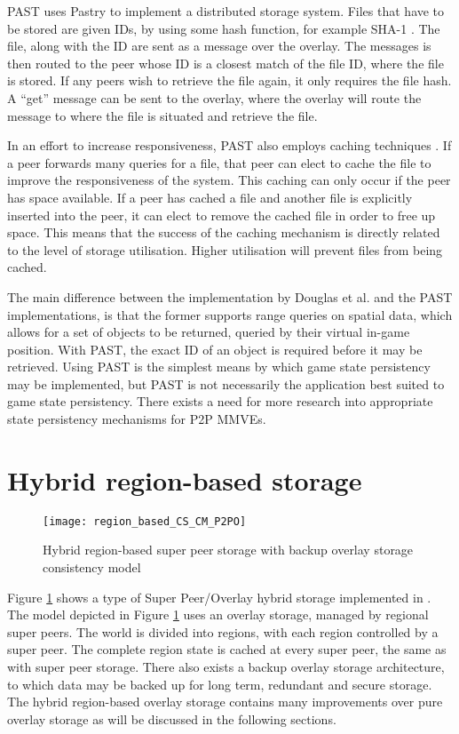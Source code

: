 PAST \cite{PAST_storage} uses Pastry to implement a distributed storage system. Files that have to be stored are given IDs, by using some hash function, for example SHA-1 \cite{SHA}. The file, along with the ID are sent as a message over the overlay. The messages is then routed to the peer whose ID is a closest match of the file ID, where the file is stored. If any peers wish to retrieve the file again, it only requires the file hash. A ``get'' message can be sent to the overlay, where the overlay will route the message to where the file is situated and retrieve the file.

In an effort to increase responsiveness, PAST also employs caching techniques \cite{storage_and_chaching_PAST}. If a peer forwards many queries for a file, that peer can elect to cache the file to improve the responsiveness of the system. This caching can only occur if the peer has space available. If a peer has cached a file and another file is explicitly inserted into the peer, it can elect to remove the cached file in order to free up space. This means that the success of the caching mechanism is directly related to the level of storage utilisation. Higher utilisation will prevent files
from being cached.

The main difference between the implementation by Douglas et al. and the PAST implementations, is that the former supports range queries on spatial data, which allows for a set of objects to be returned, queried by their virtual in-game position. With PAST, the exact ID of an object is required before it may be retrieved. Using PAST is the simplest means by which game state persistency may be implemented, but PAST is not necessarily the application best suited to game state persistency. There exists a need for more research into appropriate state persistency mechanisms for P2P MMVEs.

\section{Hybrid region-based storage}
\label{hybrid_storage}

\begin{figure}[htbp]
 \centering
 \texttt{[image: region\_based\_CS\_CM\_P2PO]}
 \caption{Hybrid region-based super peer storage with backup overlay storage consistency model}
 \label{fig_cs_region_o_cm}
\end{figure}
%
Figure \ref{fig_cs_region_o_cm} shows a type of Super Peer/Overlay hybrid storage implemented in  \cite{zoned_federation}. The model depicted in Figure \ref{fig_cs_region_o_cm} uses an overlay storage, managed by regional super peers. The world is divided into regions, with each region controlled by a super peer. The complete region state is cached at every super peer, the same as with super peer storage. There also exists a backup
overlay storage architecture, to which data may be backed up for long term, redundant and secure storage. The hybrid region-based overlay storage contains many improvements over pure overlay storage as will be discussed in the following sections.

